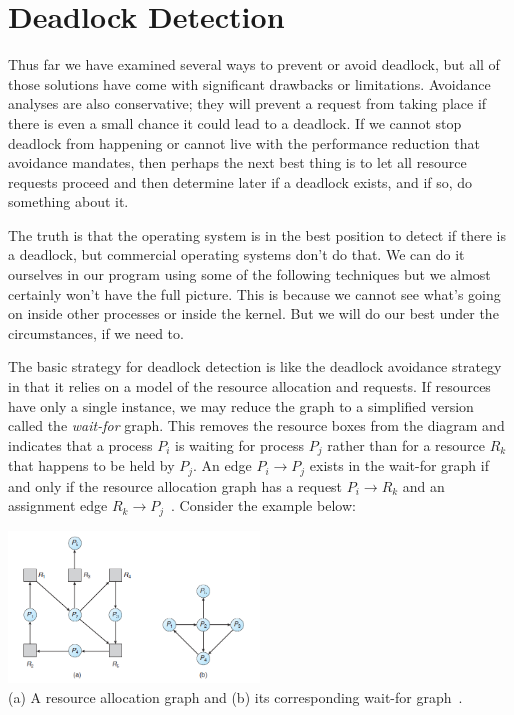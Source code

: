 




\section*{Deadlock Detection}
Thus far we have examined several ways to prevent or avoid deadlock, but all of those solutions have come with significant drawbacks or limitations. Avoidance analyses are also conservative; they will prevent a request from taking place if there is even a small chance it could lead to a deadlock. If we cannot stop deadlock from happening or cannot live with the performance reduction that avoidance mandates, then perhaps the next best thing is to let all resource requests proceed and then determine later if a deadlock exists, and if so, do something about it.

The truth is that the operating system is in the best position to detect if there is a deadlock, but commercial operating systems don't do that. We can do it ourselves in our program using some of the following techniques but we almost certainly won't have the full picture. This is because we cannot see what's going on inside other processes or inside the kernel. But we will do our best under the circumstances, if we need to. 

The basic strategy for deadlock detection is like the deadlock avoidance strategy in that it relies on a model of the resource allocation and requests. If resources have only a single instance, we may reduce the graph to a simplified version called the \textit{wait-for} graph. This removes the resource boxes from the diagram and indicates that a process $P_{i}$ is waiting for process $P_{j}$ rather than for a resource $R_{k}$ that happens to be held by $P_{j}$. An edge $P_{i} \rightarrow P_{j}$ exists in the wait-for graph if and only if the resource allocation graph has a request $P_{i} \rightarrow R_{k}$ and an assignment edge $R_{k} \rightarrow P_{j}$~\cite{osc}. Consider the example below:

\begin{center}
\includegraphics[width=0.5\textwidth]{images/rag-waitfor.png}\\
(a) A resource allocation graph and (b) its corresponding wait-for graph~\cite{osc}.
\end{center}

